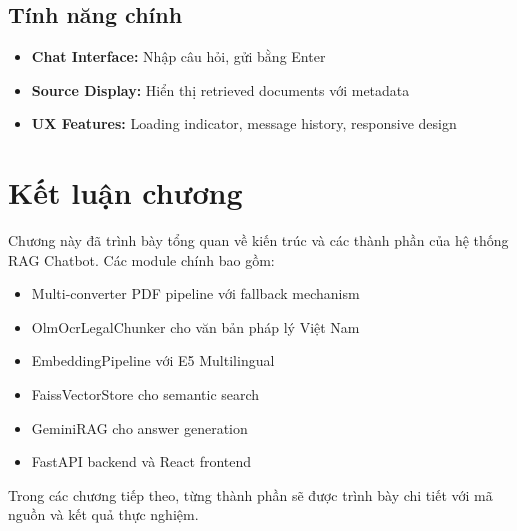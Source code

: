 \documentclass[../DoAn.tex]{subfiles}
\begin{document}
\subsection{Tính năng chính}
\begin{itemize}
    \item \textbf{Chat Interface:} Nhập câu hỏi, gửi bằng Enter
    \item \textbf{Source Display:} Hiển thị retrieved documents với metadata
    \item \textbf{UX Features:} Loading indicator, message history, responsive design
\end{itemize}

\section{Kết luận chương}
Chương này đã trình bày tổng quan về kiến trúc và các thành phần của hệ thống RAG Chatbot. Các module chính bao gồm:
\begin{itemize}
    \item Multi-converter PDF pipeline với fallback mechanism
    \item OlmOcrLegalChunker cho văn bản pháp lý Việt Nam
    \item EmbeddingPipeline với E5 Multilingual
    \item FaissVectorStore cho semantic search
    \item GeminiRAG cho answer generation
    \item FastAPI backend và React frontend
\end{itemize}

Trong các chương tiếp theo, từng thành phần sẽ được trình bày chi tiết với mã nguồn và kết quả thực nghiệm.
\end{document}
